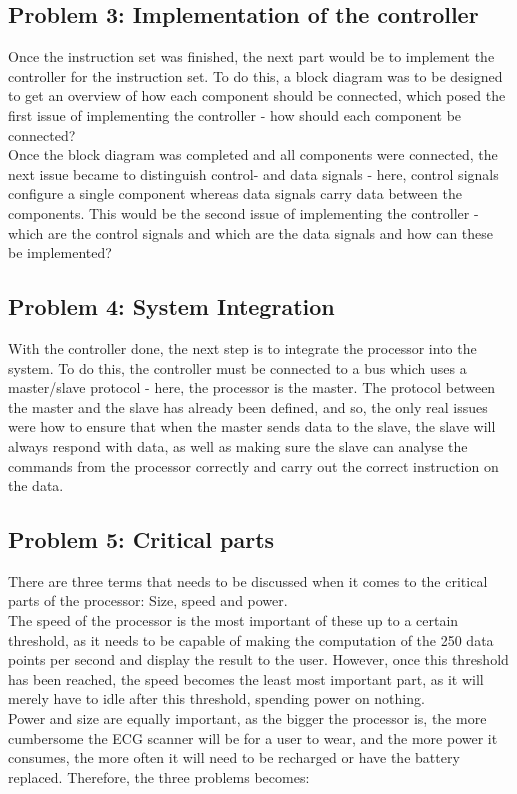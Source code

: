 \documentclass[12pt,a4paper]{article}
\begin{document}
\subsection{Problem 3: Implementation of the controller}
	Once the instruction set was finished, the next part would be to implement the controller for the instruction set. To do this, a block diagram was to be designed to get an overview of how each component should be connected, which posed the first issue of implementing the controller - how should each component be connected?\\
	Once the block diagram was completed and all components were connected, the next issue became to distinguish control- and data signals - here, control signals configure a single component whereas data signals carry data between the components. This would be the second issue of implementing the controller - which are the control signals and which are the data signals and how can these be implemented?\\
	
\subsection{Problem 4: System Integration}
	With the controller done, the next step is to integrate the processor into the system. To do this, the controller must be connected to a bus which uses a master/slave protocol - here, the processor is the master. The protocol between the master and the slave has already been defined, and so, the only real issues were how to ensure that when the master sends data to the slave, the slave will always respond with data, as well as making sure the slave can analyse the commands from the processor correctly and carry out the correct instruction on the data.\\
	
\subsection{Problem 5: Critical parts}
	There are three terms that needs to be discussed when it comes to the critical parts of the processor: Size, speed and power.\\
	The speed of the processor is the most important of these up to a certain threshold, as it needs to be capable of making the computation of the 250 data points per second and display the result to the user. However, once this threshold has been reached, the speed becomes the least most important part, as it will merely have to idle after this threshold, spending power on nothing.\\
	Power and size are equally important, as the bigger the processor is, the more cumbersome the ECG scanner will be for a user to wear, and the more power it consumes, the more often it will need to be recharged or have the battery replaced. Therefore, the three problems becomes:
	
\end{document}
